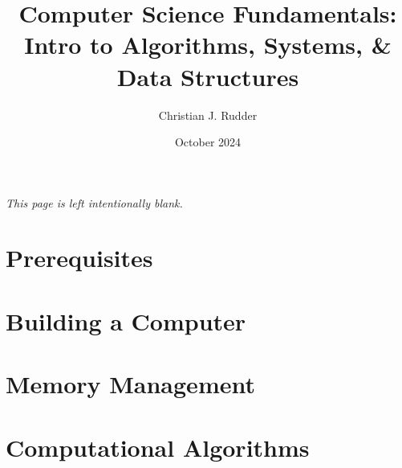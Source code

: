 \documentclass{memoir}
\title{\textbf{Computer Science Fundamentals:}\\
\Large{Intro to Algorithms, Systems, \& Data Structures}}
\author{Christian J. Rudder}
\date{October 2024}
\begin{document}
\maketitle
\setcounter{tocdepth}{2}

\tableofcontents

\newpage
\thispagestyle{empty}
\mbox{}
\vfill
\begin{center}
    \textit{This page is left intentionally blank.}
\end{center}
\vfill
\newpage



\chapter*{Prerequisites}

% 
% 

\chapter{Building a Computer}

\chapter{Memory Management}




\chapter{Computational Algorithms}





% 

% 
% 
% 
% 
\end{document}
